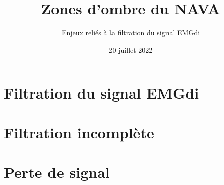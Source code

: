 \documentclass[aspectratio=169]{beamer}
\subtitle{Enjeux reliés à la filtration du signal EMGdi}
\title{Zones d'ombre du NAVA}
\date{20 juillet 2022}
\institute{\noihu\\[0.1\baselineskip]\papp}
\begin{document}
\maketitle




\maketoc

\section{Filtration du signal EMGdi}





\section{Filtration incomplète}






\section{Perte de signal}





\appendix

\end{document}
